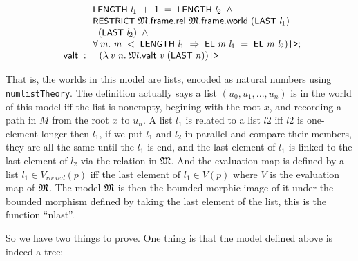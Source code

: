 \documentclass{report}
\renewcommand{\HOLConst}[1]{{\textsf{\upshape\small #1}}}
\renewcommand{\HOLinline}[1]{\ensuremath{#1}}
\newenvironment{holmath}{\begin{displaymath}\begin{array}{l}}{\end{array}\end{displaymath}\ignorespacesafterend}
\begin{document}
\begin{holmath}
\;\;\;\;\;\;\;\;\;\;\;\;\;\HOLConst{LENGTH}\;\HOLBoundVar{l\sb{\mathrm{1}}}\;\HOLSymConst{\ensuremath{+}}\;\HOLNumLit{1}\;\HOLSymConst{=}\;\HOLConst{LENGTH}\;\HOLBoundVar{l\sb{\mathrm{2}}}\;\HOLSymConst{\HOLTokenConj{}}\\
\;\;\;\;\;\;\;\;\;\;\;\;\;\HOLConst{RESTRICT}\;\HOLFreeVar{\ensuremath{\mathfrak{M}}}.\HOLFieldName{frame}.\HOLFieldName{rel}\;\HOLFreeVar{\ensuremath{\mathfrak{M}}}.\HOLFieldName{frame}.\HOLFieldName{world}\;(\HOLConst{LAST}\;\HOLBoundVar{l\sb{\mathrm{1}}})\\
\;\;\;\;\;\;\;\;\;\;\;\;\;\;\;(\HOLConst{LAST}\;\HOLBoundVar{l\sb{\mathrm{2}}})\;\HOLSymConst{\HOLTokenConj{}}\\
\;\;\;\;\;\;\;\;\;\;\;\;\;\HOLSymConst{\HOLTokenForall{}}\HOLBoundVar{m}.\;\HOLBoundVar{m}\;\HOLSymConst{\HOLTokenLt{}}\;\HOLConst{LENGTH}\;\HOLBoundVar{l\sb{\mathrm{1}}}\;\HOLSymConst{\HOLTokenImp{}}\;\HOLConst{EL}\;\HOLBoundVar{m}\;\HOLBoundVar{l\sb{\mathrm{1}}}\;\HOLSymConst{=}\;\HOLConst{EL}\;\HOLBoundVar{m}\;\HOLBoundVar{l\sb{\mathrm{2}}})\HOLTokenRightrec{};\\
\;\;\HOLFieldName{valt}\;:=\;(\HOLTokenLambda{}\HOLBoundVar{v}\;\HOLBoundVar{n}.\;\HOLFreeVar{\ensuremath{\mathfrak{M}}}.\HOLFieldName{valt}\;\HOLBoundVar{v}\;(\HOLConst{LAST}\;\HOLBoundVar{n}))\HOLTokenRightrec{}
\end{holmath}

That is, the worlds in this model are lists, encoded as natural numbers using \texttt{numlistTheory}. The definition actually says a list $(u_0,u_1,...,u_n)$ is in the world of this model iff the list is nonempty, begining with the root $x$, and recording a path in $M$ from the root $x$ to $u_n$. A list $l_1$ is related to a list $l2$ iff $l2$ is one-element longer then $l_1$, if we put $l_1$ and $l_2$ in parallel and compare their members, they are all the same until the $l_1$ is end, and the last element of $l_1$ is linked to the last element of $l_2$ via the relation in \HOLinline{\HOLFreeVar{\ensuremath{\mathfrak{M}}}}. And the evaluation map is defined by a list $l_1\in V_{rooted}(p)$ iff the last element of $l_1\in V(p)$ where $V$ is the evaluation map of \HOLinline{\HOLFreeVar{\ensuremath{\mathfrak{M}}}}. The model \HOLinline{\HOLFreeVar{\ensuremath{\mathfrak{M}}}} is then the bounded morphic image of it under the bounded morphism defined by taking the last element of the list, this is the function ``nlast''.

So we have two things to prove. One thing is that the model defined above is indeed a tree:
\end{document}
